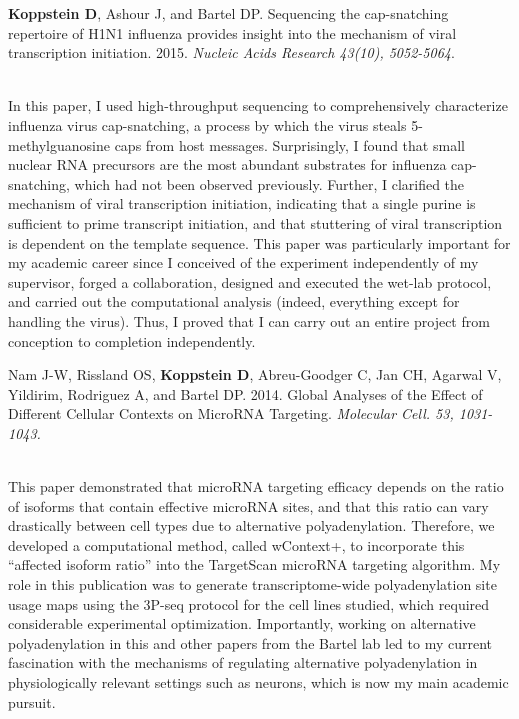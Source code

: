 \documentclass[10pt,a4paper]{article}
\begin{document}
\begin{enumerate}
{\item \textbf{Koppstein D}, Ashour J, and Bartel DP. Sequencing the cap-snatching repertoire of H1N1
influenza provides insight into the mechanism of viral transcription initiation. 2015. \textit{Nucleic Acids Research 43(10), 5052-5064}.} \vspace{0.5em} \\

In this paper, I used high-throughput sequencing to comprehensively characterize influenza virus cap-snatching, a process by which the virus steals 5-methylguanosine caps from host messages. Surprisingly, I found that small nuclear RNA precursors are the most abundant substrates for influenza cap-snatching, which had not been observed previously. Further, I clarified the mechanism of viral transcription initiation, indicating that a single purine is sufficient to prime transcript initiation, and that stuttering of viral transcription is dependent on the template sequence. This paper was particularly important for my academic career since I conceived of the experiment independently of my supervisor, forged a collaboration, designed and executed the wet-lab protocol, and carried out the computational analysis (indeed, everything except for handling the virus). Thus, I proved that I can carry out an entire project from conception to completion independently.

{\item Nam J-W, Rissland OS, \textbf{Koppstein D}, Abreu-Goodger C, Jan CH, Agarwal V, Yildirim, Rodriguez A, and Bartel DP. 2014. Global Analyses of the Effect of Different Cellular Contexts on MicroRNA Targeting. \textit{Molecular Cell. 53, 1031-1043.}} \vspace{0.5em} \\

This paper demonstrated that microRNA targeting efficacy depends on the ratio of isoforms that contain effective microRNA sites, and that this ratio can vary drastically between cell types due to alternative polyadenylation. Therefore, we developed a computational method, called wContext+, to incorporate this “affected isoform ratio” into the TargetScan microRNA targeting algorithm. My role in this publication was to generate transcriptome-wide polyadenylation site usage maps using the 3P-seq protocol for the cell lines studied, which required considerable experimental optimization. Importantly, working on alternative polyadenylation in this and other papers from the Bartel lab led to my current fascination with the mechanisms of regulating alternative polyadenylation in physiologically relevant settings such as neurons, which is now my main academic pursuit. \vspace{0.5em} \\


\end{enumerate}
\end{document}
